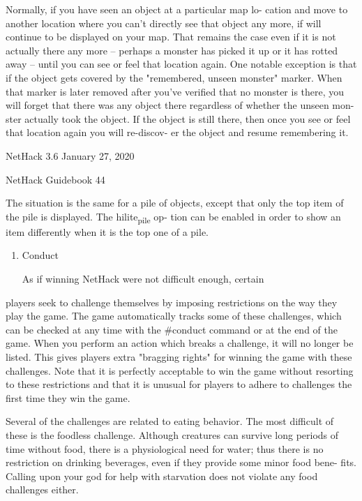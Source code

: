 \documentclass[11pt]{article}
\begin{document}
   Normally, if you have seen an object at a particular map lo-
cation and move to another location where you can't directly see
that object any more, if will continue to be displayed on your
map.  That remains the case even if it is not actually there any
more -- perhaps a monster has picked it up or it has rotted away
-- until you can see or feel that location again. One notable
exception is that if the object gets covered by the "remembered,
unseen monster" marker. When that marker is later removed after
you've verified that no monster is there, you will forget that
there was any object there regardless of whether the unseen mon-
ster actually took the object. If the object is still there,
then once you see or feel that location again you will re-discov-
er the object and resume remembering it.




NetHack 3.6                   January 27, 2020





NetHack Guidebook                       44



   The situation is the same for a pile of objects, except that
only the top item of the pile is displayed. The hilite\textsubscript{pile} op-
tion can be enabled in order to show an item differently when it
is the top one of a pile.

\begin{enumerate}
\item Conduct

As if winning NetHack were not difficult enough, certain
\end{enumerate}
players seek to challenge themselves by imposing restrictions on
the way they play the game. The game automatically tracks some
of these challenges, which can be checked at any time with the
\#conduct command or at the end of the game. When you perform an
action which breaks a challenge, it will no longer be listed.
This gives players extra "bragging rights" for winning the game
with these challenges. Note that it is perfectly acceptable to
win the game without resorting to these restrictions and that it
is unusual for players to adhere to challenges the first time
they win the game.

   Several of the challenges are related to eating behavior.
The most difficult of these is the foodless challenge.  Although
creatures can survive long periods of time without food, there is
a physiological need for water; thus there is no restriction on
drinking beverages, even if they provide some minor food bene-
fits. Calling upon your god for help with starvation does not
violate any food challenges either.
\end{document}
